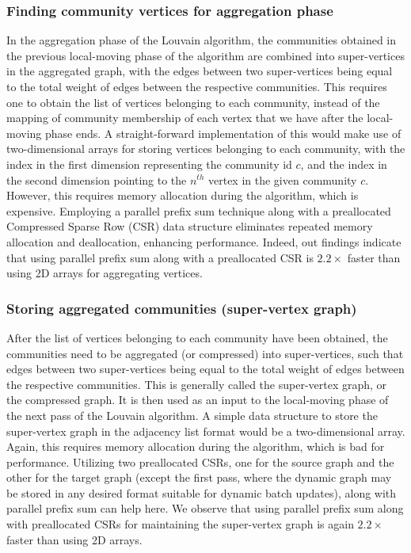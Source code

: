 \subsubsection{Finding community vertices for aggregation phase}

In the aggregation phase of the Louvain algorithm, the communities obtained in the previous local-moving phase of the algorithm are combined into super-vertices in the aggregated graph, with the edges between two super-vertices being equal to the total weight of edges between the respective communities. This requires one to obtain the list of vertices belonging to each community, instead of the mapping of community membership of each vertex that we have after the local-moving phase ends. A straight-forward implementation of this would make use of two-dimensional arrays for storing vertices belonging to each community, with the index in the first dimension representing the community id $c$, and the index in the second dimension pointing to the $n^{th}$ vertex in the given community $c$. However, this requires memory allocation during the algorithm, which is expensive. Employing a parallel prefix sum technique along with a preallocated Compressed Sparse Row (CSR) data structure eliminates repeated memory allocation and deallocation, enhancing performance. Indeed, out findings indicate that using parallel prefix sum along with a preallocated CSR is $2.2\times$ faster than using 2D arrays for aggregating vertices.


\subsubsection{Storing aggregated communities (super-vertex graph)}

After the list of vertices belonging to each community have been obtained, the communities need to be aggregated (or compressed) into super-vertices, such that edges between two super-vertices being equal to the total weight of edges between the respective communities. This is generally called the super-vertex graph, or the compressed graph. It is then used as an input to the local-moving phase of the next pass of the Louvain algorithm. A simple data structure to store the super-vertex graph in the adjacency list format would be a two-dimensional array. Again, this requires memory allocation during the algorithm, which is bad for performance. Utilizing two preallocated CSRs, one for the source graph and the other for the target graph (except the first pass, where the dynamic graph may be stored in any desired format suitable for dynamic batch updates), along with parallel prefix sum can help here. We observe that using parallel prefix sum along with preallocated CSRs for maintaining the super-vertex graph is again $2.2\times$ faster than using 2D arrays.


